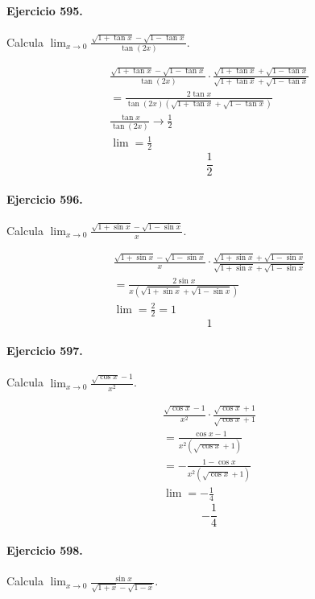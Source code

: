 \documentclass[11pt,a4paper]{article}
\begin{document}
\paragraph{Ejercicio 595.} Calcula $\displaystyle \lim_{x\to0}\frac{\sqrt{1+\tan x}-\sqrt{1-\tan x}}{\tan(2x)}$.

\[
\begin{aligned}
\frac{\sqrt{1+\tan x}-\sqrt{1-\tan x}}{\tan(2x)}\cdot\frac{\sqrt{1+\tan x}+\sqrt{1-\tan x}}{\sqrt{1+\tan x}+\sqrt{1-\tan x}}\\
=\frac{2\tan x}{\tan(2x)(\sqrt{1+\tan x}+\sqrt{1-\tan x})}\\
\frac{\tan x}{\tan(2x)}\to\frac12\\
\lim=\frac12
\end{aligned}
\]
\[\boxed{\frac12}\]


\paragraph{Ejercicio 596.} Calcula $\displaystyle \lim_{x\to0}\frac{\sqrt{1+\sin x}-\sqrt{1-\sin x}}{x}$.

\[
\begin{aligned}
\frac{\sqrt{1+\sin x}-\sqrt{1-\sin x}}{x}\cdot\frac{\sqrt{1+\sin x}+\sqrt{1-\sin x}}{\sqrt{1+\sin x}+\sqrt{1-\sin x}}\\
=\frac{2\sin x}{x(\sqrt{1+\sin x}+\sqrt{1-\sin x})}\\
\lim=\frac{2}{2}=1
\end{aligned}
\]
\[\boxed{1}\]


\paragraph{Ejercicio 597.} Calcula $\displaystyle \lim_{x\to0}\frac{\sqrt{\cos x}-1}{x^2}$.

\[
\begin{aligned}
\frac{\sqrt{\cos x}-1}{x^2}\cdot\frac{\sqrt{\cos x}+1}{\sqrt{\cos x}+1}\\
=\frac{\cos x-1}{x^2(\sqrt{\cos x}+1)}\\
=-\frac{1-\cos x}{x^2(\sqrt{\cos x}+1)}\\
\lim=-\frac14
\end{aligned}
\]
\[\boxed{-\frac14}\]


\paragraph{Ejercicio 598.} Calcula $\displaystyle \lim_{x\to0}\frac{\sin x}{\sqrt{1+x}-\sqrt{1-x}}$.
\end{document}
